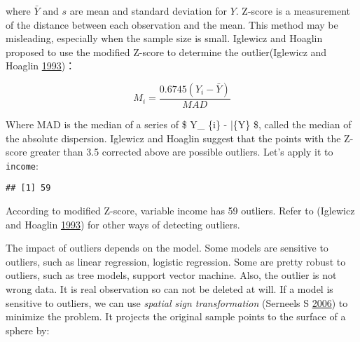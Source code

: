\documentclass[
]{article}
\newenvironment{Shaded}{\begin{snugshade}}{\end{snugshade}}
\newcommand{\CommentTok}[1]{\textcolor[rgb]{0.56,0.35,0.01}{\textit{#1}}}
\newcommand{\FloatTok}[1]{\textcolor[rgb]{0.00,0.00,0.81}{#1}}
\newcommand{\KeywordTok}[1]{\textcolor[rgb]{0.13,0.29,0.53}{\textbf{#1}}}
\newcommand{\NormalTok}[1]{#1}
\newcommand{\OperatorTok}[1]{\textcolor[rgb]{0.81,0.36,0.00}{\textbf{#1}}}
\begin{document}
where \(\bar{Y}\) and \(s\) are mean and standard deviation for \(Y\).
Z-score is a measurement of the distance between each observation and
the mean. This method may be misleading, especially when the sample size
is small. Iglewicz and Hoaglin proposed to use the modified Z-score to
determine the outlier(Iglewicz and Hoaglin
\protect\hyperlink{ref-mad1}{1993})：

\[M_{i}=\frac{0.6745(Y_{i}-\bar{Y})}{MAD}\]

Where MAD is the median of a series of \$\textbar{} Y\_ \{i\} -
\bar\{Y\} \textbar{} \$, called the median of the absolute dispersion.
Iglewicz and Hoaglin suggest that the points with the Z-score greater
than 3.5 corrected above are possible outliers. Let's apply it to
\texttt{income}:

\begin{Shaded}
\end{Shaded}

\begin{verbatim}
## [1] 59
\end{verbatim}

According to modified Z-score, variable income has 59 outliers. Refer to
(Iglewicz and Hoaglin \protect\hyperlink{ref-mad1}{1993}) for other ways
of detecting outliers.

The impact of outliers depends on the model. Some models are sensitive
to outliers, such as linear regression, logistic regression. Some are
pretty robust to outliers, such as tree models, support vector machine.
Also, the outlier is not wrong data. It is real observation so can not
be deleted at will. If a model is sensitive to outliers, we can use
\emph{spatial sign transformation} (Serneels S
\protect\hyperlink{ref-ssp}{2006}) to minimize the problem. It projects
the original sample points to the surface of a sphere by:
\end{document}
